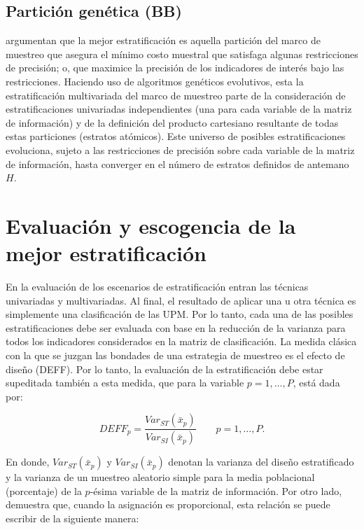 \documentclass[
  10pt,
  spanish,
]{book}
\begin{document}
\hypertarget{particiuxf3n-genuxe9tica-bb}{%
\subsection*{Partición genética (BB)}\label{particiuxf3n-genuxe9tica-bb}}

\citet{Ballin_Barcaroli_2013} argumentan que la mejor estratificación es aquella partición del marco de muestreo que asegura el mínimo costo muestral que satisfaga algunas restricciones de precisión; o, que maximice la precisión de los indicadores de interés bajo las restricciones. Haciendo uso de algoritmos genéticos evolutivos, esta la estratificación multivariada del marco de muestreo parte de la consideración de estratificaciones univariadas independientes (una para cada variable de la matriz de información) y de la definición del producto cartesiano resultante de todas estas particiones (estratos atómicos). Este universo de posibles estratificaciones evoluciona, sujeto a las restricciones de precisión sobre cada variable de la matriz de información, hasta converger en el número de estratos definidos de antemano \(H\).

\hypertarget{evaluaciuxf3n-y-escogencia-de-la-mejor-estratificaciuxf3n}{%
\section{Evaluación y escogencia de la mejor estratificación}\label{evaluaciuxf3n-y-escogencia-de-la-mejor-estratificaciuxf3n}}

En la evaluación de los escenarios de estratificación entran las técnicas univariadas y multivariadas. Al final, el resultado de aplicar una u otra técnica es simplemente una clasificación de las UPM. Por lo tanto, cada una de las posibles estratificaciones debe ser evaluada con base en la reducción de la varianza para todos los indicadores considerados en la matriz de clasificación. La medida clásica con la que se juzgan las bondades de una estrategia de muestreo es el efecto de diseño (DEFF). Por lo tanto, la evaluación de la estratificación debe estar supeditada también a esta medida, que para la variable \(p = 1, \ldots, P\), está dada por:

\[
DEFF_p = \frac{Var_{ST}(\bar x _p)}{Var_{SI}(\bar x _p)} \ \ \ \ \ \ \ \ \ p = 1, \ldots, P.
\]

En donde, \(Var_{ST}(\bar x _p)\) y \(Var_{SI}(\bar x _p)\) denotan la varianza del diseño estratificado y la varianza de un muestreo aleatorio simple para la media poblacional (porcentaje) de la \(p\)-ésima variable de la matriz de información. Por otro lado, \citet[página 184]{Gutierrez_2016} demuestra que, cuando la asignación es proporcional, esta relación se puede escribir de la siguiente manera:
\end{document}

